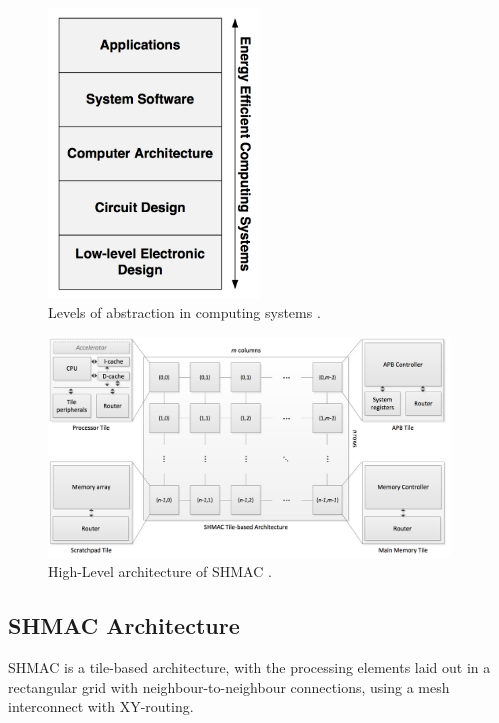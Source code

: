 \begin{figure}[htb]
    \centering
    \includegraphics[width=0.5\textwidth]{Figures/Heterogeneous/SHMACAbstractionLevels}
    \caption{Levels of abstraction in computing systems \cite{shmac-plan}.}
    \label{fig:shmacAbstractionLevels}
\end{figure}

\begin{figure}[htb]
    \centering
    \includegraphics[width=0.95\textwidth]{Figures/Heterogeneous/SHMAC}
    \caption{High-Level architecture of SHMAC \cite{shmac-plan}.}
    \label{fig:shmac}
\end{figure}

\subsection{SHMAC Architecture}

SHMAC is a tile-based architecture, with the processing elements laid out in a rectangular
grid with neighbour-to-neighbour connections, using a mesh interconnect with XY-routing.

